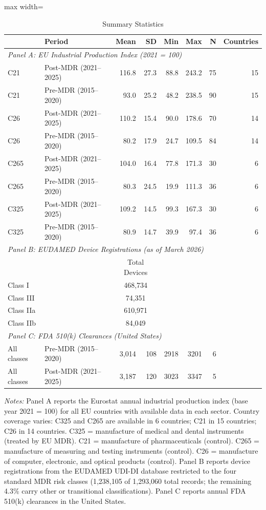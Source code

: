 \begin{table}[htbp]
\centering
\caption{Summary Statistics}
\label{tab:summary}
\begin{adjustbox}{max width=\textwidth}
\begin{tabular}{llrrrrrr}
\toprule
 & Period & Mean & SD & Min & Max & N & Countries \\
\midrule
\multicolumn{8}{l}{\textit{Panel A: EU Industrial Production Index (2021 = 100)}} \\
C21 & Post-MDR (2021--2025) & 116.8 & 27.3 & 88.8 & 243.2 & 75 & 15 \\
C21 & Pre-MDR (2015--2020) & 93.0 & 25.2 & 48.2 & 238.5 & 90 & 15 \\
C26 & Post-MDR (2021--2025) & 110.2 & 15.4 & 90.0 & 178.6 & 70 & 14 \\
C26 & Pre-MDR (2015--2020) & 80.2 & 17.9 & 24.7 & 109.5 & 84 & 14 \\
C265 & Post-MDR (2021--2025) & 104.0 & 16.4 & 77.8 & 171.3 & 30 & 6 \\
C265 & Pre-MDR (2015--2020) & 80.3 & 24.5 & 19.9 & 111.3 & 36 & 6 \\
C325 & Post-MDR (2021--2025) & 109.2 & 14.5 & 99.3 & 167.3 & 30 & 6 \\
C325 & Pre-MDR (2015--2020) & 80.9 & 14.7 & 39.9 & 97.4 & 36 & 6 \\
\midrule
\multicolumn{8}{l}{\textit{Panel B: EUDAMED Device Registrations (as of March 2026)}} \\
 & & \multicolumn{2}{c}{Total Devices} & & & & \\
Class I & & \multicolumn{2}{c}{468,734} & & & & \\
Class III & & \multicolumn{2}{c}{74,351} & & & & \\
Class IIa & & \multicolumn{2}{c}{610,971} & & & & \\
Class IIb & & \multicolumn{2}{c}{84,049} & & & & \\
\midrule
\multicolumn{8}{l}{\textit{Panel C: FDA 510(k) Clearances (United States)}} \\
All classes & Pre-MDR (2015--2020) & 3,014 & 108 & 2918 & 3201 & 6 & \\
All classes & Post-MDR (2021--2025) & 3,187 & 120 & 3023 & 3347 & 5 & \\
\bottomrule
\end{tabular}
\end{adjustbox}
\parbox{\textwidth}{\footnotesize \textit{Notes:} Panel A reports the Eurostat annual industrial production index (base year 2021 = 100) for all EU countries with available data in each sector. Country coverage varies: C325 and C265 are available in 6 countries; C21 in 15 countries; C26 in 14 countries. C325 = manufacture of medical and dental instruments (treated by EU MDR). C21 = manufacture of pharmaceuticals (control). C265 = manufacture of measuring and testing instruments (control). C26 = manufacture of computer, electronic, and optical products (control). Panel B reports device registrations from the EUDAMED UDI-DI database restricted to the four standard MDR risk classes (1,238,105 of 1,293,060 total records; the remaining 4.3\% carry other or transitional classifications). Panel C reports annual FDA 510(k) clearances in the United States.}
\end{table}
